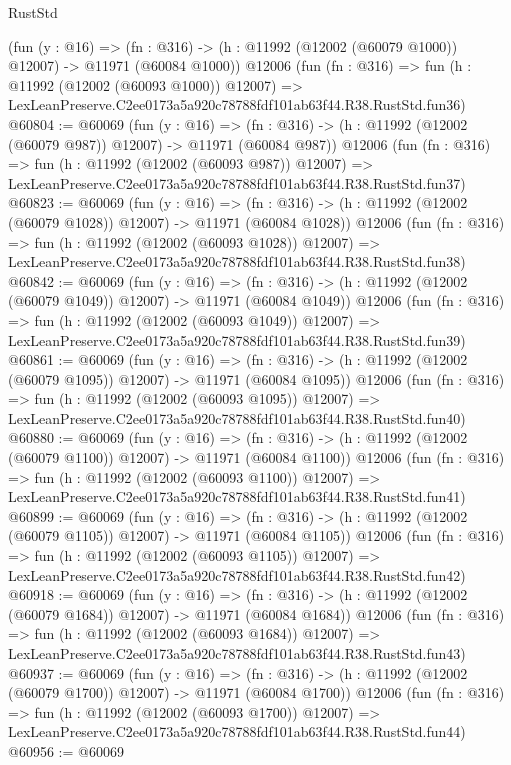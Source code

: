 \begin{lexlean}{RustStd}
\begin{coremodule}
    (fun (y : @16) =>
    (fn : @316) -> (h : @11992 (@12002 (@60079 @1000)) @12007) -> @11971 (@60084 @1000))
    @12006
    (fun (fn : @316) =>
    fun (h : @11992 (@12002 (@60093 @1000)) @12007) =>
    LexLeanPreserve.C2ee0173a5a920c78788fdf101ab63f44.R38.RustStd.fun36)
@60804 := @60069
    (fun (y : @16) =>
    (fn : @316) -> (h : @11992 (@12002 (@60079 @987)) @12007) -> @11971 (@60084 @987))
    @12006
    (fun (fn : @316) =>
    fun (h : @11992 (@12002 (@60093 @987)) @12007) =>
    LexLeanPreserve.C2ee0173a5a920c78788fdf101ab63f44.R38.RustStd.fun37)
@60823 := @60069
    (fun (y : @16) =>
    (fn : @316) -> (h : @11992 (@12002 (@60079 @1028)) @12007) -> @11971 (@60084 @1028))
    @12006
    (fun (fn : @316) =>
    fun (h : @11992 (@12002 (@60093 @1028)) @12007) =>
    LexLeanPreserve.C2ee0173a5a920c78788fdf101ab63f44.R38.RustStd.fun38)
@60842 := @60069
    (fun (y : @16) =>
    (fn : @316) -> (h : @11992 (@12002 (@60079 @1049)) @12007) -> @11971 (@60084 @1049))
    @12006
    (fun (fn : @316) =>
    fun (h : @11992 (@12002 (@60093 @1049)) @12007) =>
    LexLeanPreserve.C2ee0173a5a920c78788fdf101ab63f44.R38.RustStd.fun39)
@60861 := @60069
    (fun (y : @16) =>
    (fn : @316) -> (h : @11992 (@12002 (@60079 @1095)) @12007) -> @11971 (@60084 @1095))
    @12006
    (fun (fn : @316) =>
    fun (h : @11992 (@12002 (@60093 @1095)) @12007) =>
    LexLeanPreserve.C2ee0173a5a920c78788fdf101ab63f44.R38.RustStd.fun40)
@60880 := @60069
    (fun (y : @16) =>
    (fn : @316) -> (h : @11992 (@12002 (@60079 @1100)) @12007) -> @11971 (@60084 @1100))
    @12006
    (fun (fn : @316) =>
    fun (h : @11992 (@12002 (@60093 @1100)) @12007) =>
    LexLeanPreserve.C2ee0173a5a920c78788fdf101ab63f44.R38.RustStd.fun41)
@60899 := @60069
    (fun (y : @16) =>
    (fn : @316) -> (h : @11992 (@12002 (@60079 @1105)) @12007) -> @11971 (@60084 @1105))
    @12006
    (fun (fn : @316) =>
    fun (h : @11992 (@12002 (@60093 @1105)) @12007) =>
    LexLeanPreserve.C2ee0173a5a920c78788fdf101ab63f44.R38.RustStd.fun42)
@60918 := @60069
    (fun (y : @16) =>
    (fn : @316) -> (h : @11992 (@12002 (@60079 @1684)) @12007) -> @11971 (@60084 @1684))
    @12006
    (fun (fn : @316) =>
    fun (h : @11992 (@12002 (@60093 @1684)) @12007) =>
    LexLeanPreserve.C2ee0173a5a920c78788fdf101ab63f44.R38.RustStd.fun43)
@60937 := @60069
    (fun (y : @16) =>
    (fn : @316) -> (h : @11992 (@12002 (@60079 @1700)) @12007) -> @11971 (@60084 @1700))
    @12006
    (fun (fn : @316) =>
    fun (h : @11992 (@12002 (@60093 @1700)) @12007) =>
    LexLeanPreserve.C2ee0173a5a920c78788fdf101ab63f44.R38.RustStd.fun44)
@60956 := @60069

\end{coremodule}
\end{lexlean}
